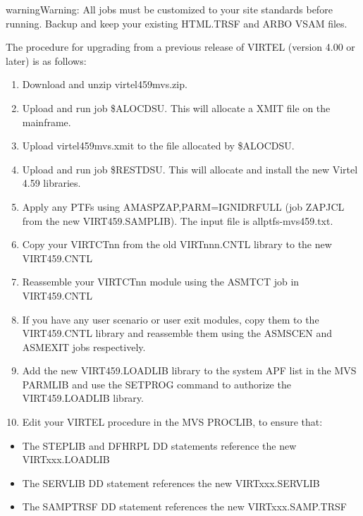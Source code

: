 \documentclass[letterpaper,10pt,english]{sphinxmanual}
\begin{document}
\begin{sphinxadmonition}{warning}{Warning:}
All jobs must be customized to your site standards before running. Backup and keep your existing HTML.TRSF and ARBO VSAM files.
\end{sphinxadmonition}

The procedure for upgrading from a previous release of VIRTEL (version 4.00 or later) is as follows:
\begin{enumerate}
\def\theenumi{\arabic{enumi}}
\def\labelenumi{\theenumi .}
\makeatletter\def\p@enumii{\p@enumi \theenumi .}\makeatother
\item {} 
Download and unzip virtel459mvs.zip.

\item {} 
Upload and run job \$ALOCDSU. This will allocate a XMIT file on the mainframe.

\item {} 
Upload virtel459mvs.xmit to the file allocated by \$ALOCDSU.

\item {} 
Upload and run job \$RESTDSU. This will allocate and install the new Virtel 4.59 libraries.

\item {} 
Apply any PTFs using AMASPZAP,PARM=IGNIDRFULL (job ZAPJCL from the new VIRT459.SAMPLIB). The input file is allptfs-mvs459.txt.

\item {} 
Copy your VIRTCTnn from the old VIRTnnn.CNTL library to the new VIRT459.CNTL

\item {} 
Reassemble your VIRTCTnn module using the ASMTCT job in VIRT459.CNTL

\item {} 
If you have any user scenario or user exit modules, copy them to the VIRT459.CNTL library and reassemble them using the ASMSCEN and ASMEXIT jobs respectively.

\item {} 
Add the new VIRT459.LOADLIB library to the system APF list in the MVS PARMLIB and use the SETPROG command to authorize the VIRT459.LOADLIB library.

\item {} 
Edit your VIRTEL procedure in the MVS PROCLIB, to ensure that:

\end{enumerate}
\begin{itemize}
\item {} 
The STEPLIB and DFHRPL DD statements reference the new VIRTxxx.LOADLIB

\item {} 
The SERVLIB DD statement references the new VIRTxxx.SERVLIB

\item {} 
The SAMPTRSF DD statement references the new VIRTxxx.SAMP.TRSF

\end{itemize}
\end{document}
